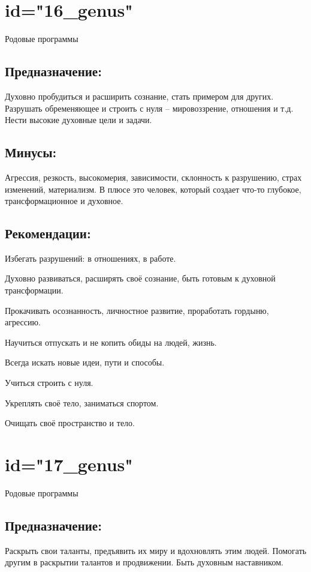 \endsection

\section{id="16_genus"}{Родовые программы}

\subsection{Предназначение:}
Духовно пробудиться и расширить сознание, стать примером для 
других. Разрушать обременяющее и строить с нуля – мировоззрение, 
отношения и т.д. Нести высокие духовные цели и задачи.
\endsubsection

\subsection{Минусы:}
Агрессия, резкость, высокомерия, зависимости, склонность к 
разрушению, страх изменений, материализм.
В плюсе это человек, который создает что-то глубокое, 
трансформационное и духовное.
\endsubsection

\subsection{Рекомендации:}
\item Избегать разрушений: в отношениях, в работе.
\item Духовно развиваться, расширять своё сознание, быть готовым 
к духовной трансформации.
\item Прокачивать осознанность, личностное развитие, проработать 
гордыню, агрессию.
\item Научиться отпускать и не копить обиды на людей, жизнь.
\item Всегда искать новые идеи, пути и способы.
\item Учиться строить с нуля.
\item Укреплять своё тело, заниматься спортом.
\item Очищать своё пространство и тело.
\endsubsection

\endsection

\section{id="17_genus"}{Родовые программы}

\subsection{Предназначение:}
Раскрыть свои таланты, предъявить их миру и вдохновлять этим 
людей. Помогать другим в раскрытии талантов и продвижении. Быть 
духовным наставником.
\endsubsection

